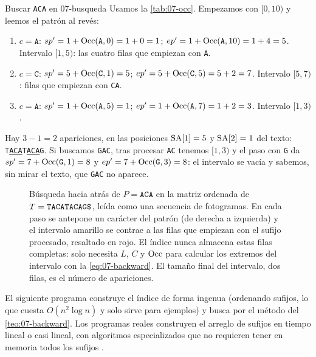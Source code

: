 \begin{ejemplo}{Buscar \texttt{ACA} en \capsieteT}{07-busqueda}
Usamos la \cref{tab:07-occ}. Empezamos con $[0,10)$ y leemos el patrón al revés:
\begin{enumerate}
  \item $c=\texttt{A}$: $sp'=1+\operatorname{Occ}(\texttt{A},0)=1+0=1$; $ep'=1+\operatorname{Occ}(\texttt{A},10)=1+4=5$. Intervalo $[1,5)$: las cuatro filas que empiezan con \texttt{A}.
  \item $c=\texttt{C}$: $sp'=5+\operatorname{Occ}(\texttt{C},1)=5$; $ep'=5+\operatorname{Occ}(\texttt{C},5)=5+2=7$. Intervalo $[5,7)$: filas que empiezan con \texttt{CA}.
  \item $c=\texttt{A}$: $sp'=1+\operatorname{Occ}(\texttt{A},5)=1$; $ep'=1+\operatorname{Occ}(\texttt{A},7)=1+2=3$. Intervalo $[1,3)$.
\end{enumerate}
Hay $3-1=2$ apariciones, en las posiciones $\operatorname{SA}[1]=5$ y $\operatorname{SA}[2]=1$ del texto: \texttt{T\underline{ACA}T\underline{ACA}G}. Si buscamos \texttt{GAC}, tras procesar \texttt{AC} tenemos $[1,3)$ y el paso con \texttt{G} da $sp'=7+\operatorname{Occ}(\texttt{G},1)=8$ y $ep'=7+\operatorname{Occ}(\texttt{G},3)=8$: el intervalo se vacía y sabemos, sin mirar el texto, que \texttt{GAC} no aparece.
\end{ejemplo}

\begin{figure}[tbp]
\centering

\caption[Búsqueda hacia atrás paso a paso]{Búsqueda hacia atrás de $P=\texttt{ACA}$ en la matriz ordenada de $T=\texttt{TACATACAG\$}$, leída como una secuencia de fotogramas. En cada paso se antepone un carácter del patrón (de derecha a izquierda) y el intervalo amarillo se contrae a las filas que empiezan con el sufijo procesado, resaltado en rojo. El índice nunca almacena estas filas completas: solo necesita $L$, $C$ y $\operatorname{Occ}$ para calcular los extremos del intervalo con la \cref{eq:07-backward}. El tamaño final del intervalo, dos filas, es el número de apariciones.}
\label{fig:07-backward}
\end{figure}

El siguiente programa construye el índice de forma ingenua (ordenando sufijos, lo que cuesta $O(n^2\log n)$ y solo sirve para ejemplos) y busca por el método del \cref{teo:07-backward}. Los programas reales construyen el arreglo de sufijos en tiempo lineal o casi lineal, con algoritmos especializados que no requieren tener en memoria todos los sufijos \parencite{c07-makinen2015}.

